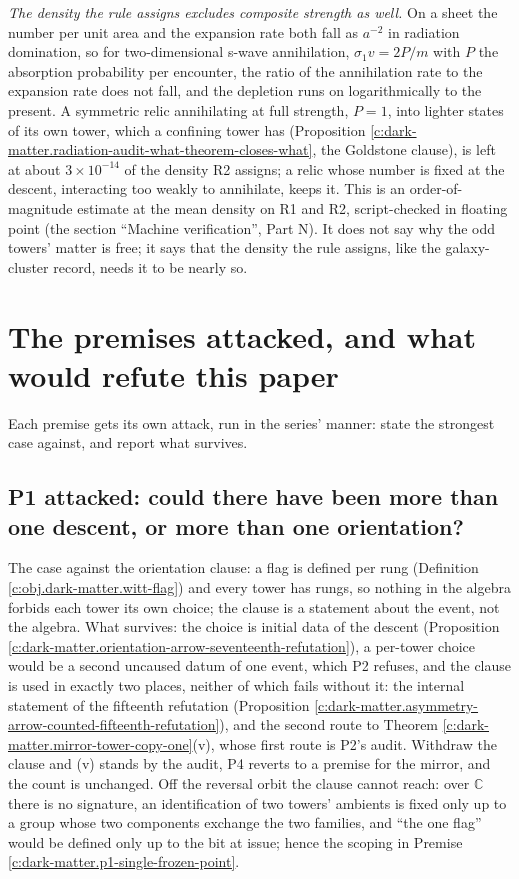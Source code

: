 \documentclass[11pt]{article}
\theoremstyle{definition}
\theoremstyle{plain}
\providecommand{\C}{}\renewcommand{\C}{\mathbb{C}}
\begin{document}
\emph{The density the rule assigns excludes composite strength as well.} On a sheet the number per unit area and the expansion rate both fall as $a^{-2}$ in radiation domination, so for two-dimensional s-wave annihilation, $\sigma_{1}v = 2P/m$ with $P$ the absorption probability per encounter, the ratio of the annihilation rate to the expansion rate does not fall, and the depletion runs on logarithmically to the present. A symmetric relic annihilating at full strength, $P = 1$, into lighter states of its own tower, which a confining tower has (Proposition \ref{c:dark-matter.radiation-audit-what-theorem-closes-what}, the Goldstone clause), is left at about $3 \times 10^{-14}$ of the density R2 assigns; a relic whose number is fixed at the descent, interacting too weakly to annihilate, keeps it. This is an order-of-magnitude estimate at the mean density on R1 and R2, script-checked in floating point (the section ``Machine verification'', Part N). It does not say why the odd towers' matter is free; it says that the density the rule assigns, like the galaxy-cluster record, needs it to be nearly so.

\section{The premises attacked, and what would refute this paper}

\label{c:note.dark-matter.setting-premises-attacked-what-would-refute}
Each premise gets its own attack, run in the series' manner: state the strongest case against, and report what survives.

\subsection*{P1 attacked: could there have been more than one descent, or more than one orientation?}
\label{c:note.dark-matter.setting-p1-attacked-could-there-have}
The case against the orientation clause: a flag is defined per rung (Definition \ref{c:obj.dark-matter.witt-flag}) and every tower has rungs, so nothing in the algebra forbids each tower its own choice; the clause is a statement about the event, not the algebra. What survives: the choice is initial data of the descent (Proposition \ref{c:dark-matter.orientation-arrow-seventeenth-refutation}), a per-tower choice would be a second uncaused datum of one event, which P2 refuses, and the clause is used in exactly two places, neither of which fails without it: the internal statement of the fifteenth refutation (Proposition \ref{c:dark-matter.asymmetry-arrow-counted-fifteenth-refutation}), and the second route to Theorem \ref{c:dark-matter.mirror-tower-copy-one}(v), whose first route is P2's audit. Withdraw the clause and (v) stands by the audit, P4 reverts to a premise for the mirror, and the count is unchanged. Off the reversal orbit the clause cannot reach: over $\C$ there is no signature, an identification of two towers' ambients is fixed only up to a group whose two components exchange the two families, and ``the one flag'' would be defined only up to the bit at issue; hence the scoping in Premise \ref{c:dark-matter.p1-single-frozen-point}.
\end{document}
